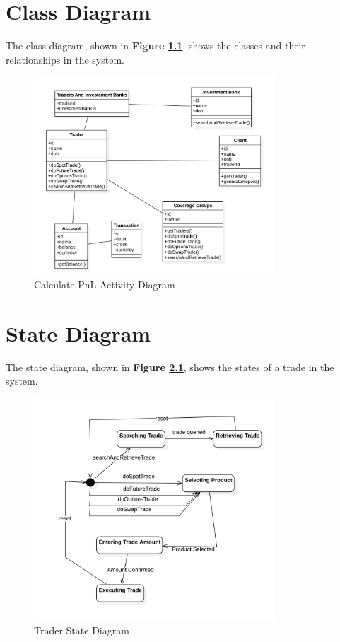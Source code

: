 \documentclass[a4paper]{report}
\begin{document}
\chapter{Class Diagram}

The class diagram, shown in \textbf{Figure \ref{fig:analysis-class-diagram}}, shows the classes and their relationships in the system.

\begin{figure}[h!]
    \centering
    \includegraphics[width=0.8\textwidth]{images/analysis-class-diagram.png}
    \caption{Calculate PnL Activity Diagram}
    \label{fig:analysis-class-diagram}
\end{figure}

\chapter{State Diagram}

The state diagram, shown in \textbf{Figure \ref{fig:trade-state-diagram}}, shows the states of a trade in the system.

\begin{figure}[h!]
    \centering
    \includegraphics[width=0.8\textwidth]{images/state-diagram-trader.png}
    \caption{Trader State Diagram}
    \label{fig:trade-state-diagram}
\end{figure}
\end{document}
